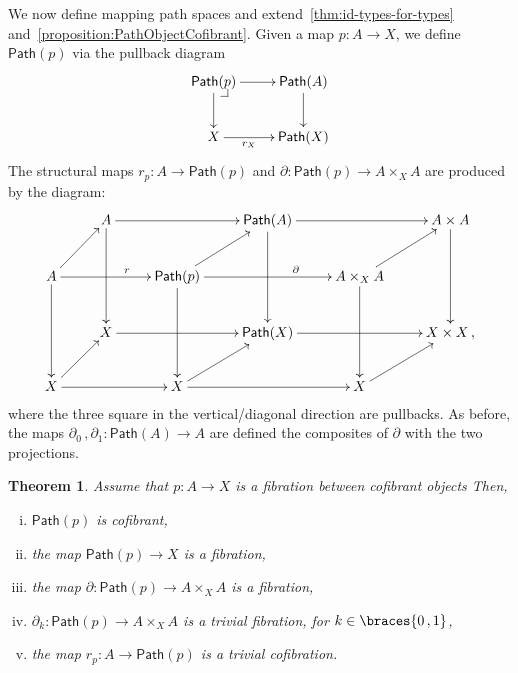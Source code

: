 \documentclass[reqno,10pt,a4paper,oneside,draft]{amsart}
\makeatletter
\numberwithin{equation}{section}
\theoremstyle{mythm}
\newtheorem{theorem}{Theorem}[section]
\theoremstyle{mydef}
\theoremstyle{myrmk}
\newcommand{\pullback}[1]{\save*!/#1-1.2pc/#1:(-1,1)@^{|-}\restore}
\newcommand{\drpullback}{\pullback{dr}}
\newcommand{\co}{\colon}
\DeclarePairedDelimiter\braces\lbrace\rbrace
\newcommand{\Path}{\mathsf{Path}}
\makeatother
\begin{document}
We now define mapping path spaces and  extend~\cref{thm:id-types-for-types} and~\cref{proposition:PathObjectCofibrant}. Given a map $p \co A \to X$, we define $\Path(p)$ 
via the pullback diagram
\[
\xymatrix{
\Path(p) \drpullback \ar[r] \ar[d] & \Path(A) \ar[d] \\
X \ar[r]_-{r_X} & \Path(X) }
\]
The structural maps $r_p \co A \rightarrow \Path(p)$ and $\partial \co \Path(p) \rightarrow A \times_{X} A$ are produced by the diagram:
\[
\xymatrix{
& A \ar[rr] \ar[dd] & & \Path(A) \ar[rr] \ar[dd] & & A \times A \ar[dd] \\
A \ar[ur] \ar[rr]^(.6){r}  \ar[dd] & & \Path(p) \ar[ur] \ar[rr]^(.65){\partial} \ar[dd] & & A \times_{X} A \ar[ur] \ar[dd] \\
& X \ar[rr] & & \Path(X) \ar[rr] & & X \times X \, , \\
X \ar[ur] \ar[rr] & & X \ar[rr] \ar[ur] & & X \ar[ur] \\ 
}
\]
where the three square in the vertical/diagonal direction are pullbacks. As before, the maps
$\partial_0 \, , \partial_1 \co \Path(A) \to A$ are defined the composites of $\partial$
with the two projections. 


\begin{theorem}
\label{thm:MainPathObject}
Assume that $p \co A \rightarrow X $ is a fibration between cofibrant objects Then,
\begin{enumerate}[(i)] 
\item \label{thm:MainPathObject:IdBifib} $\Path(p)$ is cofibrant, 
\item the map $\Path(p) \rightarrow X$ is a fibration,
\item the map $\partial \co \Path(p) \rightarrow A \times_{X} A$ is a fibration,
\item $\partial_k \co \Path(p) \rightarrow A \times_{X} A$  is a trivial fibration, for $k \in \braces{0 \, , 1 }$,
\item the map $r_p \co A \rightarrow \Path(p)$ is a trivial cofibration.
\end{enumerate}
\end{theorem}
\end{document}
